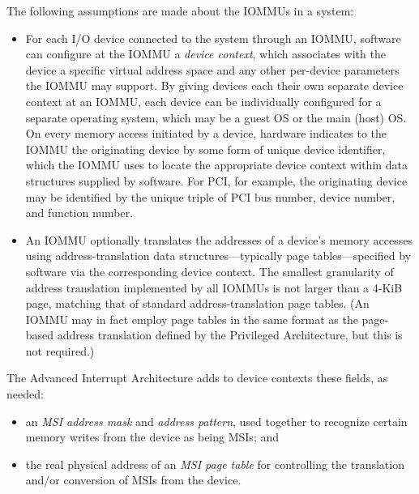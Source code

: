 The following assumptions are made about the \mbox{IOMMU}s in a system:
\begin{itemize}

\item
For each I/O device connected to the system through an \mbox{IOMMU},
software can configure at the \mbox{IOMMU} a \emph{device context}, which
associates with the device a specific virtual address space and any
other per-device parameters the \mbox{IOMMU} may support.
By giving devices each their own separate device context at an \mbox{IOMMU},
each device can be individually configured for a separate
operating system, which may be a guest OS or the main (host) OS.
On every memory access initiated by a device, hardware indicates to
the \mbox{IOMMU} the originating device by some form of unique device
identifier, which the \mbox{IOMMU} uses to locate the appropriate device
context within data structures supplied by software.
For PCI, for example, the originating device may be identified by the
unique triple of PCI bus number, device number, and function number.

\item
An \mbox{IOMMU} optionally translates the addresses of a device's memory
accesses using address-translation data structures---typically page
tables---specified by software via the corresponding device context.
The smallest granularity of address translation implemented by all
\mbox{IOMMU}s is not larger than a \mbox{4-KiB} page, matching that of
standard {\RISCV} address-translation page tables.
(An \mbox{IOMMU} may in fact employ page tables in the same format as the
page-based address translation defined by the {\RISCV} Privileged
Architecture, but this is not required.)

\end{itemize}

The Advanced Interrupt Architecture adds to device contexts these
fields, as needed:
\begin{itemize}

\item
an \emph{MSI address mask} and \emph{address pattern}, used together to
recognize certain memory writes from the device as being MSIs; and

\item
the real physical address of an \emph{MSI page table} for controlling
the translation and/or conversion of MSIs from the device.

\end{itemize}

